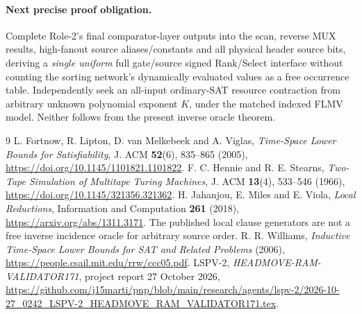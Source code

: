\documentclass[11pt]{article}
\begin{document}
\paragraph{Next precise proof obligation.}
Complete Role-2's final comparator-layer outputs into the scan, reverse MUX results, high-fanout source aliases/constants and all physical header source bits, deriving a \emph{single uniform} full gate/source signed Rank/Select interface without counting the sorting network's dynamically evaluated values as a free occurrence table. Independently seek an all-input ordinary-SAT resource contraction from arbitrary unknown polynomial exponent $K$, under the matched indexed FLMV model. Neither follows from the present inverse oracle theorem.

\begin{thebibliography}{9}
 L. Fortnow, R. Lipton, D. van Melkebeek and A. Viglas, \emph{Time-Space Lower Bounds for Satisfiability}, J. ACM \textbf{52}(6), 835--865 (2005), \url{https://doi.org/10.1145/1101821.1101822}.
 F. C. Hennie and R. E. Stearns, \emph{Two-Tape Simulation of Multitape Turing Machines}, J. ACM \textbf{13}(4), 533--546 (1966), \url{https://doi.org/10.1145/321356.321362}.
 H. Jahanjou, E. Miles and E. Viola, \emph{Local Reductions}, Information and Computation \textbf{261} (2018), \url{https://arxiv.org/abs/1311.3171}. The published local clause generators are not a free inverse incidence oracle for arbitrary source order.
 R. R. Williams, \emph{Inductive Time-Space Lower Bounds for SAT and Related Problems} (2006), \url{https://people.csail.mit.edu/rrw/ccc05.pdf}.
 LSPV-2, \emph{HEADMOVE-RAM-VALIDATOR171}, project report 27 October 2026, \url{https://github.com/j15marti/pnp/blob/main/research/agents/lspv-2/2026-10-27_0242_LSPV-2_HEADMOVE_RAM_VALIDATOR171.tex}.
\end{thebibliography}
\end{document}
